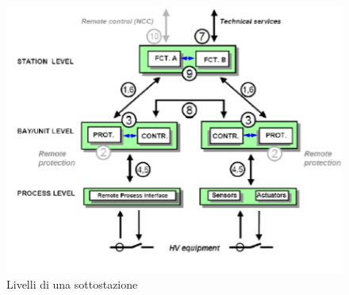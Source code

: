 \begin{figure}[h]
	\centering
	\includegraphics[scale=0.400]{imgs/61850ls.png}
	\caption{Livelli di una sottostazione} \label{fig:61850ls}
\end{figure}

